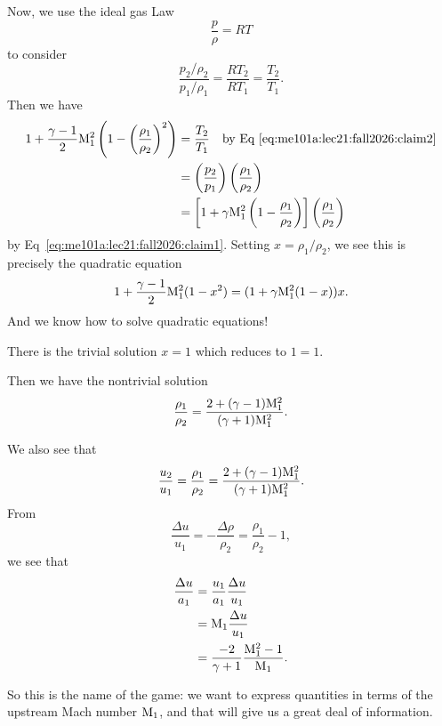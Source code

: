 \begin{node}
Now, we use the ideal gas Law
\begin{equation}
\frac{p}{\rho}=RT
\end{equation}
to consider
\begin{equation}
\frac{p_{2}/\rho_{2}}{p_{1}/\rho_{1}}=\frac{RT_{2}}{RT_{1}}=\frac{T_{2}}{T_{1}}.
\end{equation}
Then we have
\begin{subequations}
  \begin{align}
1 + \frac{\gamma-1}{2}\mathrm{M}_{1}^{2}\left(1-\left(\frac{\rho_{1}}{\rho_{2}}\right)^{2}\right)
&=\frac{T_{2}}{T_{1}}
\quad\mbox{by Eq~\eqref{eq:me101a:lec21:fall2026:claim2}}\\
&=\left(\frac{p_{2}}{p_{1}}\right)\left(\frac{\rho_{1}}{\rho_{2}}\right)\\
&=\left[1+\gamma\mathrm{M}_{1}^{2}\left(1-\frac{\rho_{1}}{\rho_{2}}\right)\right]\left(\frac{\rho_{1}}{\rho_{2}}\right)
  \end{align}
\end{subequations}
by Eq~\eqref{eq:me101a:lec21:fall2026:claim1}. Setting $x=\rho_{1}/\rho_{2}$,
we see this is precisely the quadratic equation
\begin{equation}
1 + \frac{\gamma-1}{2}\mathrm{M}_{1}^{2}(1-x^{2})=(1+\gamma\mathrm{M}_{1}^{2}(1-x))x.
\end{equation}
And we know how to solve quadratic equations!

There is the trivial solution $x=1$ which reduces to $1=1$.

Then we have the nontrivial solution
\begin{equation}
\frac{\rho_{1}}{\rho_{2}}=\frac{2+(\gamma-1)\mathrm{M}_{1}^{2}}{(\gamma+1)\mathrm{M}_{1}^{2}}.
\end{equation}
\end{node}

\begin{node}
We also see that
\begin{equation}
\frac{u_{2}}{u_{1}}=\frac{\rho_{1}}{\rho_{2}}=\frac{2+(\gamma-1)\mathrm{M}_{1}^{2}}{(\gamma+1)\mathrm{M}_{1}^{2}}.
\end{equation}
From
\begin{equation}
\frac{\Delta u}{u_{1}}=-\frac{\Delta\rho}{\rho_{2}}=\frac{\rho_{1}}{\rho_{2}}-1,
\end{equation}
we see that
\begin{subequations}
  \begin{align}
\frac{\Delta u}{a_{1}} &= \frac{u_{1}}{a_{1}}\frac{\Delta u}{u_{1}}\\
&=\mathrm{M}_{1}\frac{\Delta u}{u_{1}}\\
&=\frac{-2}{\gamma+1}\frac{\mathrm{M}_{1}^{2}-1}{\mathrm{M}_{1}}.
  \end{align}
\end{subequations}
\end{node}

\begin{node}
So this is the name of the game: we want to express quantities in
terms of the upstream Mach number $\mathrm{M}_{1}$, and that will give us a
great deal of information.
\end{node}